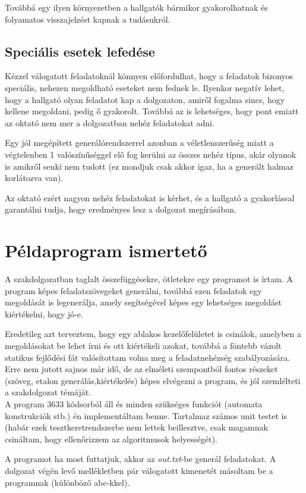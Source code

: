 \documentclass[12pt]{report}
\theoremstyle{definition}
\begin{document}
Továbbá egy ilyen környezetben a hallgatók bármikor gyakorolhatnak és folyamatos visszajelzést kapnak a tudásukról. 

\subsection*{Speciális esetek lefedése}
Kézzel válogatott feladatoknál könnyen előfordulhat, hogy a feladatok bizonyos speciális, nehezen megoldható eseteket nem fednek le. Ilyenkor negatív lehet, hogy a hallgató olyan feladatot kap a dolgozaton, amiről fogalma sincs, hogy kellene megoldani, pedig ő gyakorolt. Továbbá az is lehetséges, hogy pont emiatt az oktató nem mer a dolgozatban nehéz feladatokat adni.

Egy jól megépített generálórendszerrel azonban a véletlenszerűség miatt a végtelenben 1 valószínűséggel elő fog kerülni az összes nehéz típus, akár olyanok is amikről senki nem tudott (ez mondjuk csak akkor igaz, ha a generált halmaz korlátozva van).

Az oktató ezért nagyon nehéz feladatokat is kérhet, és a hallgató a gyakorlással garantálni tudja, hogy eredményes lesz a dolgozat megírásában.

\section{Példaprogram ismertető}

A szakdolgozatban taglalt összefüggésekre, ötletekre egy programot is írtam. A program képes feladatszövegeket generálni, továbbá ezen feladatok egy megoldását is legenerálja, amely segítségével képes egy lehetséges megoldást kiértékelni, hogy jó-e.

Eredetileg azt terveztem, hogy egy ablakos kezelőfelületet is csinálok, amelyben a megoldásokat be lehet írni és ott kiértékeli azokat, továbbá a föntebb vázolt statikus fejlődési fát valósítottam volna meg a feladatnehézség szabályozására. Erre nem jutott sajnos már idő, de az elméleti szempontból fontos részeket (szöveg, etalon generálás,kiértékelés) képes elvégezni a program, és jól szemlélteti a szakdolgozat témáját.\\

A program 3633 kódsorból áll és minden szükséges funkciót (automata konstrukciók stb.) én implementáltam benne. Tartalmaz számos unit testet is (habár ezek tesztkeretrendszerbe nem lettek beillesztve, csak magamnak csináltam, hogy ellenőrizzem az algoritmusok helyességét).

A programot ha most futtatjuk, akkor az \textit{out.txt}-be generál feladatokat. A dolgozat végén levő mellékletben pár válogatott kimenetét másoltam be a programnak (különböző abc-kkel).\\
\end{document}
